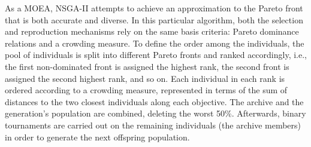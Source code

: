 As a \ac{MOEA}, \ac{NSGA-II} attempts to achieve an approximation to the Pareto front that is both accurate and diverse. In this particular algorithm, both the selection and reproduction mechanisms rely on the same basis criteria: Pareto dominance relations and a crowding measure. To define the order among the individuals, the pool of individuals is split into different Pareto fronts and ranked accordingly, i.e., the first non-dominated front is assigned the highest rank, the second front is assigned the second highest rank, and so on. Each individual in each rank is ordered according to a crowding measure, represented in terms of the sum of distances to the two closest individuals along each objective. The archive and the generation's population are combined, deleting the worst 50\%. Afterwards, binary tournaments are carried out on the remaining individuals (the archive members) in order to generate the next offspring population.
